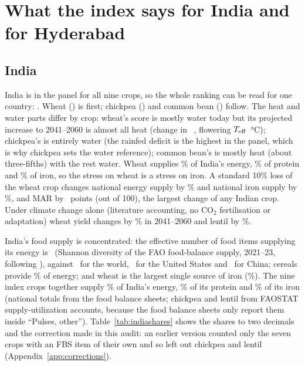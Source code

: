 \section{What the index says for India and for Hyderabad}\label{sec:india}

\subsection{India}
India is in the panel for all nine crops, so the whole ranking can be read for one country: \indOrder.
Wheat (\indWheatFFour) is first; chickpea (\indChickpeaFFour) and common bean (\indBeanFFour) follow. The heat
and water parts differ by crop: wheat's score is mostly water today but its projected increase to 2041--2060
is almost all heat (change in \Fd\ \indWheatdFFour, flowering $T_{\mathrm{eff}}$ \indWheatdTeff\,\si{\celsius}); chickpea's
is entirely water (the rainfed deficit is the highest in the panel, which is why chickpea sets the water
reference); common bean's is mostly heat (about three-fifths) with the rest water. Wheat supplies \indWheatShKcal\% of
India's energy, \indWheatShProtein\% of protein and \indWheatShIron\% of iron, so the stress on wheat is a
stress on iron. A standard 10\% loss of the wheat crop changes national energy supply by \indWheatShockKcal\% and national
iron supply by \indWheatShockIron\%, and MAR by \indWheatShockMar\ points (out of 100), the largest change of
any Indian crop. Under climate change alone (literature accounting, no CO$_2$ fertilisation or adaptation) wheat
yield changes by \indWheatdY\% in 2041--2060 and lentil by \indLentildY\%.

India's food supply is concentrated: the effective number of food items supplying its energy is \divIndKcal\
(Shannon diversity of the FAO food-balance supply, 2021--23, following \citealp{remans2014}), against \divWorldKcal\ for the world, \divUsaKcal\
for the United States and \divChnKcal\ for China; cereals provide \divIndCereal\% of energy; and wheat is the
largest single source of iron (\divIndIronTopShare\%). The nine index crops together supply \divIndNineKcal\% of India's energy,
\divIndNineProtein\% of its protein and \divIndNineIron\% of its iron (national totals from the food balance sheets; chickpea
and lentil from FAOSTAT supply-utilization accounts, because the food balance sheets only report them inside ``Pulses, other'').
Table~\ref{tab:indiashares} shows the shares to two decimals and the correction made in this audit: an earlier version
counted only the seven crops with an FBS item of their own and so left out chickpea and lentil
(Appendix~\ref{app:corrections}).


